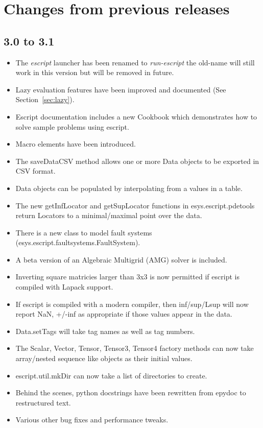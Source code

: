
%
%
%

\section{Changes from previous releases}
\label{app:changes}

\subsection*{3.0 to 3.1}
\begin{itemize}
\item{The \emph{escript} launcher has been renamed to \emph{run-escript} the old-name will still work in this version
but will be removed in future.}
\item Lazy evaluation features have been improved and documented (See Section~\ref{sec:lazy}).
 \item Escript documentation includes a new Cookbook which demonstrates how to solve sample problems using escript.
\item Macro elements have been introduced.
\item The saveDataCSV method allows one or more Data objects to be exported in CSV format.
\item Data objects can be populated by interpolating from a values in a table.
\item The new getInfLocator and getSupLocator functions in esys.escript.pdetools return Locators to a minimal/maximal point over the data.
\item There is a new class to model fault systems (esys.escript.faultsystems.FaultSystem).
\item A beta version of an Algebraic Multigrid (AMG) solver is included.
\item Inverting square matricies larger than 3x3 is now permitted if escript is compiled with Lapack support.
\item If escript is compiled with a modern compiler, then inf/sup/Lsup will now report NaN, +/-inf as appropriate if those values appear in the data.
\item Data.setTags will take tag names as well as tag numbers.
\item The Scalar, Vector, Tensor, Tensor3, Tensor4 factory methods can now take array/nested sequence like objects as their initial values.
\item escript.util.mkDir can now take a list of directories to create.
\item Behind the scenes, python docstrings have been rewritten from epydoc to restructured text.
\item Various other bug fixes and performance tweaks.
\end{itemize}


